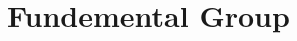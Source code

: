 \documentclass[../main.tex]{subfiles}
\begin{document}
\chapter{ Fundemental Group }
\end{document}
